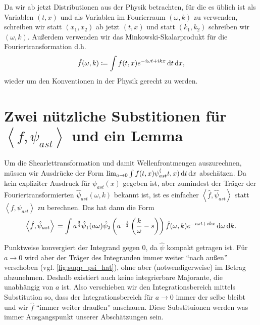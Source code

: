 
\begin{remark}[Notation]
    Da wir ab jetzt Distributionen aus der Physik betrachten, für die es üblich ist als Variablen $(t, x)$ und als Variablen im Fourierraum $(\omega, k)$ zu verwenden, schreiben wir statt $(x_1, x_2)$ ab jetzt $(t,x)$ und statt $(k_1, k_2)$ schreiben wir $(\omega, k)$. Außerdem verwenden wir das Minkowski-Skalarprodukt für die Fouriertransformation d.h.
    \begin{equation*}
        \hat f (\omega, k) \coloneqq \int f(t,x) e^{-i\omega t + i k x}
        \mathop{}\!\mathrm{d} t \mathop{}\!\mathrm{d} x
        ,
    \end{equation*}
    wieder um den Konventionen in der Physik gerecht zu werden.
\end{remark}

\section{\texorpdfstring{Zwei nützliche Substitionen für  $\left<f, \psi_{ast}\right>$ und ein Lemma}{Zwei nützliche Substitutionen und Lemmata}}
\label{sec:substitutionen}

Um die Shearlettransformation und damit Wellenfrontmengen auszurechnen, müssen wir Ausdrücke der Form \(\lim_{a \to 0} \int f (t,x) \psi_{ast}^ (t,x) \mathop{}\!\mathrm{d} t \mathop{}\!\mathrm{d} x\) abschätzen. Da kein expliziter Ausdruck für $\psi_{ast}(x)$ gegeben ist, aber zumindest der Träger der Fouriertransformierten \(\hat \psi_{ast} (\omega, k)\) bekannt ist, ist es einfacher \(\left<\hat f, \hat \psi_{ast}\right>\) statt \(\left< f, \psi_{ast} \right>\) zu berechnen. Das hat dann die Form
\begin{equation}
    \left< \hat f, \hat\psi_{ast}\right> \\
    = \int a^{\frac{3}{4}} \hat \psi_1(a \omega)
    \hat \psi_2 \left(a^{-\frac{1}{2}} \left(\frac{k}{\omega} - s\right)\right)
    \hat f (\omega,k) e^{-i \omega t + ikx} \mathop{}\!\mathrm{d} \omega \mathop{}\!\mathrm{d} k.
\end{equation}

Punktweise konvergiert der Integrand gegen 0, da $\hat \psi$ kompakt getragen ist. Für $a \to 0$ wird aber der Träger des Integranden immer weiter "`nach außen"' verschoben (vgl. \cref{fig:supp_psi_hat}), ohne aber (notwendigerweise) im Betrag abzunehmen. Deshalb existiert auch keine integrierbare Majorante, die unabhängig von $a$ ist. Also verschieben wir den Integrationsbereich mittels Substitution so, dass der Integrationsbereich für $a \to 0$ immer der selbe bleibt und wir $\hat f$ "`immer weiter draußen"' anschauen. Diese Substituionen werden was immer Ausgangspunkt unserer Abschätzungen sein.

